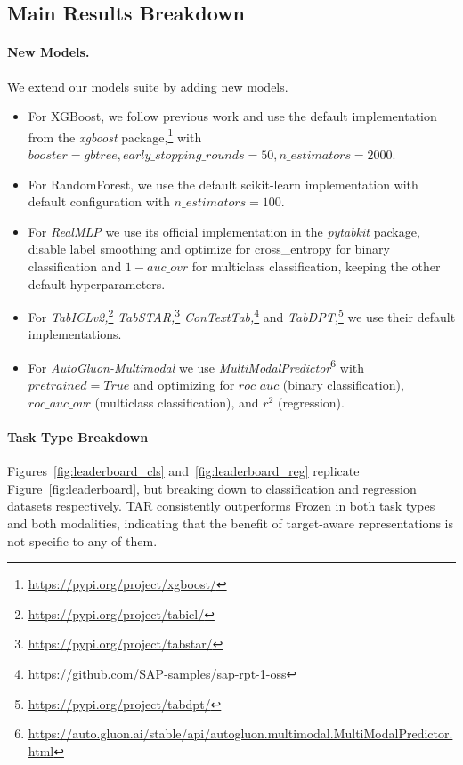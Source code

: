 \documentclass{llmxive}
\begin{document}
\subsection{Main Results Breakdown}

\paragraph{New Models.} We extend our models suite by adding new models. 

\begin{itemize}
\item For XGBoost, we follow previous work \cite{gorishniy_revisiting_2021, arazi_tabstar_2025} and use the default implementation from the \textit{xgboost} package,\footnote{\url{https://pypi.org/project/xgboost/}} with $booster = gbtree, early\_stopping\_rounds = 50, n\_estimators = 2000$. 

\item For RandomForest, we use the default scikit-learn implementation with default configuration with $n\_estimators = 100$. 

\item For \textit{RealMLP} we use its official implementation in the \textit{pytabkit} package, disable label smoothing and optimize for cross\_entropy for binary classification and
$1-auc\_ovr$ for multiclass classification, keeping the other default hyperparameters. 

\item For \textit{TabICLv2,}\footnote{\url{https://pypi.org/project/tabicl/}} \textit{TabSTAR,}\footnote{\url{https://pypi.org/project/tabstar/}} \textit{ConTextTab,}\footnote{\url{https://github.com/SAP-samples/sap-rpt-1-oss}} and \textit{TabDPT,}\footnote{\url{https://pypi.org/project/tabdpt/}} we use their default implementations.

\item For \textit{AutoGluon-Multimodal} we use \textit{MultiModalPredictor}\footnote{\url{https://auto.gluon.ai/stable/api/autogluon.multimodal.MultiModalPredictor.html}} with $pretrained=True$ and optimizing for $roc\_auc$ (binary classification), $roc\_auc\_ovr$ (multiclass classification), and $r^2$ (regression).
\end{itemize}


\paragraph{Task Type Breakdown} 
Figures~\ref{fig:leaderboard_cls} and~\ref{fig:leaderboard_reg} replicate Figure~\ref{fig:leaderboard}, but breaking down to classification and regression datasets respectively.
TAR consistently outperforms Frozen in both task types and both modalities, indicating that the benefit of target-aware representations is not specific to any of them.
\end{document}
